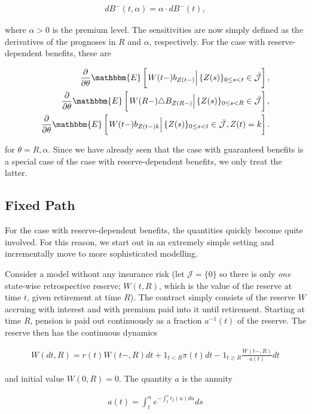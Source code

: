 \documentclass{article}
\newcommand{\1}[1]{\mathbbm{1}_{\left\lbrace #1 \right\rbrace}}
\newcommand{\econd}[2][def]{\mathbbm{E} \left[ \left. #1 \right| #2 \right]}
\theoremstyle{break}
\theoremstyle{remark}
\numberwithin{equation}{section}
\begin{document}
\begin{align*}
	dB^-(t, \alpha) = \alpha \cdot dB^-(t),
\end{align*}

where $\alpha>0$ is the premium level. The sensitivities are now simply defined as the derivatives of the prognoses in $R$ and $\alpha$, respectively. For the case with reserve-dependent benefits, these are

\begin{align*}
	\frac{\partial}{\partial \theta} \econd[W(t-)b_{Z(t-)}]{\{Z(s) \}_{0 \leq s < t} \in \bar{\mathcal{J}}}, \\
	\frac{\partial}{\partial \theta} \econd[W(R-) \triangle B_{Z(R-)}]{\{Z(s) \}_{0 \leq s < R} \in \bar{\mathcal{J}}}, \\
	\frac{\partial}{\partial \theta} \econd[W(t-)b_{Z(t-)k}]{\{Z(s) \}_{0 \leq s < t} \in \bar{\mathcal{J}}, Z(t) = k}.
\end{align*}

for  $\theta = R,\alpha$. Since we have already seen that the case with guaranteed benefits is a special case of the case with reserve-dependent benefits, we only treat the latter.

\subsection{Fixed Path}

For the case with reserve-dependent benefits, the quantities quickly become quite involved. For this reason, we start out in an extremely simple setting and incrementally move to more sophisticated modelling.

Consider a model without any insurance risk (let $\mathcal{J} = \{ 0 \}$ so there is only \textit{one} state-wise retrospective reserve; $W(t,R)$, which is the value of the reserve at time $t$, given retirement at time $R$). The contract simply consists of the reserve $W$ accruing with interest and with premium paid into it until retirement. Starting at time $R$, pension is paid out continuously as a fraction $a^{-1}(t)$ of the reserve. The reserve then has the continuous dynamics

\begin{align} \label{ReserveDE}
	W(dt,R) = r(t) W(t-,R) dt + 1_{t<R} \pi(t) dt - 1_{t \geq R} \frac{W(t-,R)}{a(t)} dt
\end{align}

and initial value $W(0,R)=0$. The quantity $a$ is the annuity

\begin{align*}
	a(t) = \int_t^n e^{-\int_t^s \bar{r}_t(u) du} ds
\end{align*}
\end{document}
